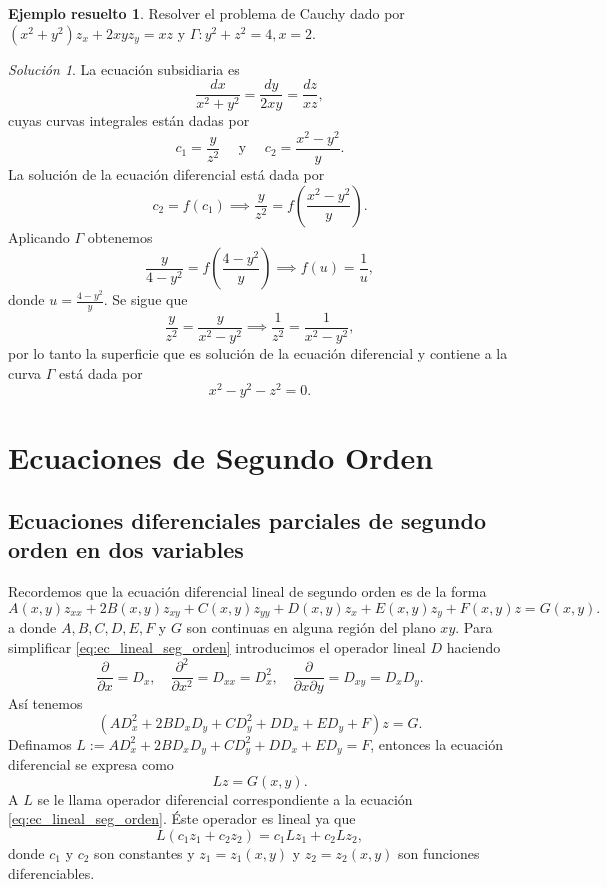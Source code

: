 \documentclass[11pt,letterpaper,draft]{report}
\theoremstyle{plain}
\theoremstyle{definition}
\newtheorem{solved}[theorem]{Ejemplo resuelto}
\theoremstyle{remark}
\newtheorem*{solution}{Solución}
\newcommand\<{\langle}
\renewcommand\>{\rangle}
\begin{document}
\begin{solved}
  Resolver el problema de Cauchy dado por $(x^2+y^2) z_x +
  2xy z_y = xz$ y $\Gamma : y^2 + z^2 = 4, x = 2$.
  \begin{solution}
    La ecuación subsidiaria es
    \[
    \frac{dx}{x^2+y^2} = \frac{dy}{2xy} = \frac{dz}{xz},
    \] 
    cuyas curvas integrales están dadas por
    \[
    c_1 = \frac{y}{z^2} \quad \text{ y } \quad c_2 =
    \frac{x^2-y^2}{y}.
    \] 
    La solución de la ecuación diferencial está dada por
    \[
    c_2 = f(c_1) \implies \frac{y}{z^2} =
    f\left(\frac{x^2-y^2}{y}\right).
    \] 
    Aplicando $\Gamma$ obtenemos
    \[
    \frac{y}{4-y^2} = f\left(\frac{4-y^2}{y}\right) \implies
    f(u) = \frac{1}{u},
    \] 
    donde $u = \frac{4-y^2}{y}$. Se sigue que
    \[
    \frac{y}{z^2} = \frac{y}{x^2-y^2} \implies \frac{1}{z^2}
    = \frac{1}{x^2-y^2},
    \] 
    por lo tanto la superficie que es solución de la
    ecuación diferencial y contiene a la curva $\Gamma$ está
    dada por
    \[
    x^2 - y^2 - z^2 = 0.
    \] 
  \end{solution}
\end{solved}

\chapter{Ecuaciones de Segundo Orden}

\section{Ecuaciones diferenciales parciales de segundo orden
  en dos variables}
\label{sec:lin-orden-2}

Recordemos que la ecuación diferencial lineal de segundo
orden es de la forma
\begin{equation}
  \label{eq:ec_lineal_seg_orden}
  A(x,y) z_{xx} + 2B(x,y)z_{xy} + C(x,y) z_{yy} + D(x,y) z_x
  + E(x,y) z_y + F(x,y) z = G(x,y).
\end{equation}a
donde $A,B,C,D,E,F$ y $G$ son continuas en alguna región del
plano $xy$. Para simplificar \ref{eq:ec_lineal_seg_orden}
introducimos el operador lineal $D$ haciendo
\[
\frac{\partial}{\partial x} = D_x, \quad
\frac{\partial^2}{\partial x^2} = D_{xx} = D_x^2, \quad
\frac{\partial}{\partial x \partial y} = D_{xy} = D_x D_y.
\] 
Así tenemos
\[
  (AD_x^2 + 2BD_xD_y + CD_y^2 + DD_x + ED_y + F)z = G.
\] 
Definamos $L := AD_x^2 + 2BD_xD_y + CD_y^2 + D D_x + ED_y =
F$, entonces la ecuación diferencial se expresa como
\begin{equation}
  \label{eq:ec_expr_diferencial}
  Lz = G(x,y).
\end{equation}
A $L$ se le llama operador diferencial correspondiente a la
ecuación \ref{eq:ec_lineal_seg_orden}. Éste operador es
lineal ya que
\[
L(c_1z_1 + c_2z_2) = c_1 Lz_1 + c_2 Lz_2,
\] 
donde $c_1$ y $c_2$ son constantes y $z_1 = z_1(x,y)$ y
$z_2 = z_2(x,y)$ son funciones diferenciables.
\end{document}
